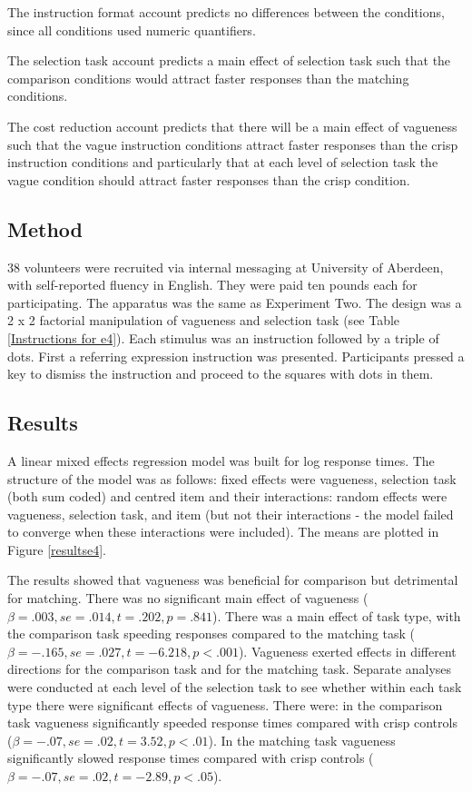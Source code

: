\documentclass[doc,apacite]{apa6}
\begin{document}
The instruction format account predicts no differences between the conditions, since all conditions used numeric quantifiers.

The selection task account predicts a main effect of selection task such that the comparison conditions would attract faster responses than the matching conditions.

The cost reduction account predicts that there will be a main effect of vagueness such that the vague instruction conditions attract faster responses than the crisp instruction conditions and particularly that at each level of selection task the vague condition should attract faster responses than the crisp condition.


\subsection{Method}

38 volunteers were recruited via internal messaging at University of Aberdeen, with self-reported fluency in English. They were paid ten pounds each for participating.
The apparatus was the same as Experiment Two.
The design was a 2 x 2 factorial manipulation of vagueness and selection task (see Table \ref{Instructions for e4}).
Each stimulus was an instruction followed by a triple of dots.
First a referring expression instruction was presented. Participants pressed a key to dismiss the instruction and proceed to the squares with dots in them.

\subsection{Results}
A linear mixed effects regression model was built for log response times. The structure of the model was as follows: fixed effects were vagueness, selection task (both sum coded) and centred item and their interactions: random effects were vagueness, selection task, and item (but not their interactions - the model failed to converge when these interactions were included). The means are plotted in Figure \ref{resultse4}.

The results showed that vagueness was beneficial for comparison but detrimental for matching. There was no significant main effect of vagueness ($\beta =.003, se=.014, t=.202, p=.841$). There was a main effect of task type, with the comparison task speeding responses compared to the matching task ($\beta=-.165, se=.027, t=-6.218, p<.001$). Vagueness exerted effects in different directions for the comparison task and for the matching task. Separate analyses were conducted at each level of the selection task to see whether within each task type there were significant effects of vagueness. There were: in the comparison task vagueness significantly speeded response times compared with crisp controls ($\beta=-.07, se=.02, t=3.52, p<.01$). In the matching task vagueness significantly slowed response times compared with crisp controls ($\beta=-.07, se=.02, t=-2.89, p<.05$).
\end{document}
